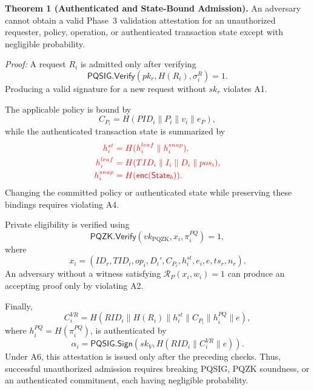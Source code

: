 \documentclass[lettersize,journal]{IEEEtran}
\begin{document}
\textbf{Theorem 1 (Authenticated and State-Bound Admission).}
An adversary cannot obtain a valid Phase~3 validation attestation for
an unauthorized requester, policy, operation, or authenticated
transaction state except with negligible probability.

\emph{Proof:}
A request $R_i$ is admitted only after verifying
\begin{equation}
\mathsf{PQSIG.Verify}
(pk_r,H(R_i),\sigma_i^R)=1.
\label{eq:sec_req_auth}
\end{equation}
Producing a valid signature for a new request without $sk_r$ violates
A1.

The applicable policy is bound by
\begin{equation}
C_{P_i}=H(PID_i\parallel P_i\parallel v_i\parallel e_P),
\end{equation}
while the authenticated transaction state is summarized by
\begin{equation}
\textcolor{red}{\begin{aligned}
h_i^{st}&=H(h_i^{leaf}\parallel h_i^{snap}),\\
h_i^{leaf}&=H(TID_i\parallel I_i\parallel D_i\parallel pos_i),\\
h_i^{snap}&=H(\mathsf{enc}(\mathsf{State}_b)).
\end{aligned}}
\label{eq:sec_state_digest}
\end{equation}
Changing the committed policy or authenticated state while preserving
these bindings requires violating A4.

Private eligibility is verified using
\begin{equation}
\mathsf{PQZK.Verify}
(vk_{\mathrm{PQZK}},x_i,\pi_i^{PQ})=1,
\end{equation}
where
\begin{equation}
x_i=
(ID_r,TID_i,op_i,D_i',C_{P_i},h_i^{st},
e_i,e,ts_r,n_r).
\end{equation}
An adversary without a witness satisfying
$\mathcal{R}_P(x_i,w_i)=1$ can produce an accepting proof only by
violating A2.

Finally,
\begin{equation}
C_i^{VR}
=
H(RID_i\parallel H(R_i)\parallel h_i^{st}
\parallel C_{P_i}\parallel h_i^{PQ}\parallel e),
\end{equation}
where $h_i^{PQ}=H(\pi_i^{PQ})$, is authenticated by
\begin{equation}
\alpha_i=
\mathsf{PQSIG.Sign}
(sk_V,H(RID_i\parallel C_i^{VR}\parallel e)).
\end{equation}
Under A6, this attestation is issued only after the preceding checks.
Thus, successful unauthorized admission requires breaking PQSIG,
PQZK soundness, or an authenticated commitment, each having negligible
probability.
\end{document}

